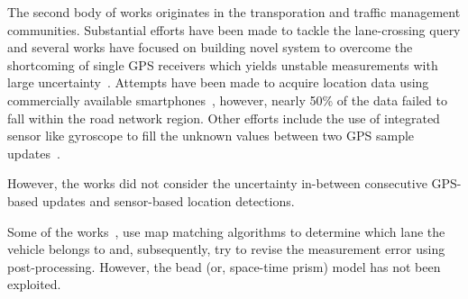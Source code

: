 The second body of works originates in the transporation and traffic management communities.
Substantial efforts have been made to tackle the lane-crossing query and 
several works have focused on building novel system to overcome 
the shortcoming of single GPS receivers which yields unstable measurements 
with large uncertainty~\cite{lane_dao,jie_lane}. Attempts have been made to 
acquire location data using commercially available smartphones~\cite{Sekimoto_lane}, however,
nearly 50\% of the data failed to fall within the road network region.
Other efforts include the  use of integrated sensor like gyroscope to fill the
unknown values between two GPS sample updates~\cite{Toledo_lane}.

However, the works did not consider the uncertainty in-between consecutive GPS-based updates and sensor-based
location detections.

Some of the works~\cite{jie_lane,Toledo_lane}, use map matching algorithms to determine 
which lane the vehicle belongs to and, subsequently, try to revise the measurement error using post-processing. 
However, the bead (or, space-time prism) model has not been exploited.

